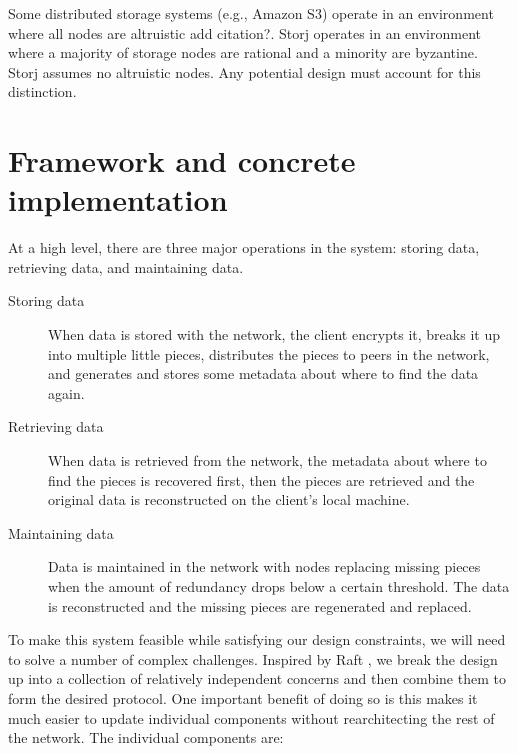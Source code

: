\documentclass[a4paper,10pt]{article} \usepackage[utf8]{inputenc}
\begin{document}
Some distributed storage systems (e.g., Amazon S3) operate in an environment
where all nodes are altruistic {\color{red}add citation?}.
Storj operates in an environment where a
majority of storage nodes are rational and a minority are byzantine. Storj
assumes no altruistic nodes. Any
potential design must account for this distinction.

\section{Framework and concrete implementation}\label{sec:framework}

At a high level, there are three major operations in the system: storing data,
retrieving data, and maintaining data.

\begin{description}

\item[Storing data] When data is stored with the network, the client encrypts
it, breaks it up into multiple little pieces, distributes the pieces to peers in
the network, and generates and stores some metadata about where to find the data
again.

\item[Retrieving data] When data is retrieved from the network, the metadata
about where to find the pieces is recovered first, then the pieces are retrieved
and the original data is reconstructed on the client's local machine.

\item[Maintaining data] Data is maintained in the network with nodes replacing
missing pieces when the amount of redundancy drops below a certain threshold.
The data is reconstructed and the missing pieces are regenerated and replaced.

\end{description}

To make this system feasible while satisfying our design constraints, we will
need to solve a number of complex challenges. Inspired by Raft \cite{raft}, we
break the design up into a collection of relatively independent concerns and
then combine them to form the desired protocol. One important benefit of doing
so is this makes it much easier to update individual components without
rearchitecting the rest of the network. The individual components are:
\end{document}
